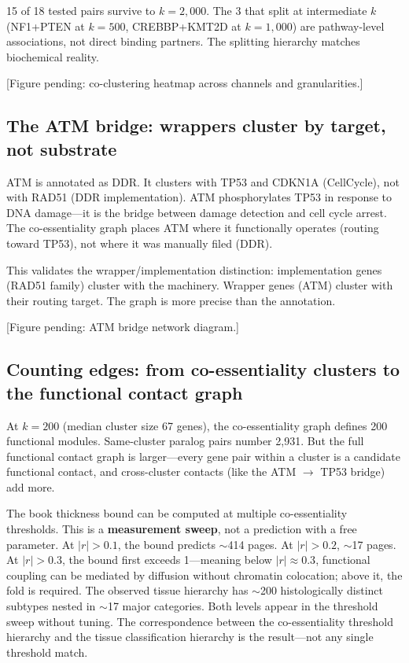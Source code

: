 \documentclass[11pt]{article}
\theoremstyle{definition}
\begin{document}
15 of 18 tested pairs survive to $k{=}2{,}000$. The 3 that split at intermediate $k$ (NF1+PTEN at $k{=}500$, CREBBP+KMT2D at $k{=}1{,}000$) are pathway-level associations, not direct binding partners. The splitting hierarchy matches biochemical reality.

[Figure pending: co-clustering heatmap across channels and granularities.]

\subsection{The ATM bridge: wrappers cluster by target, not substrate}

ATM is annotated as DDR. It clusters with TP53 and CDKN1A (CellCycle), not with RAD51 (DDR implementation). ATM phosphorylates TP53 in response to DNA damage---it is the bridge between damage detection and cell cycle arrest. The co-essentiality graph places ATM where it functionally operates (routing toward TP53), not where it was manually filed (DDR).

This validates the wrapper/implementation distinction: implementation genes (RAD51 family) cluster with the machinery. Wrapper genes (ATM) cluster with their routing target. The graph is more precise than the annotation.

[Figure pending: ATM bridge network diagram.]

\subsection{Counting edges: from co-essentiality clusters to the functional contact graph}

At $k{=}200$ (median cluster size 67 genes), the co-essentiality graph defines 200 functional modules. Same-cluster paralog pairs number 2,931. But the full functional contact graph is larger---every gene pair within a cluster is a candidate functional contact, and cross-cluster contacts (like the ATM $\to$ TP53 bridge) add more.

The book thickness bound can be computed at multiple co-essentiality thresholds. This is a \textbf{measurement sweep}, not a prediction with a free parameter. At $|r| > 0.1$, the bound predicts $\sim$414 pages. At $|r| > 0.2$, $\sim$17 pages. At $|r| > 0.3$, the bound first exceeds 1---meaning below $|r| \approx 0.3$, functional coupling can be mediated by diffusion without chromatin colocation; above it, the fold is required. The observed tissue hierarchy has $\sim$200 histologically distinct subtypes nested in $\sim$17 major categories. Both levels appear in the threshold sweep without tuning. The correspondence between the co-essentiality threshold hierarchy and the tissue classification hierarchy is the result---not any single threshold match.
\end{document}
